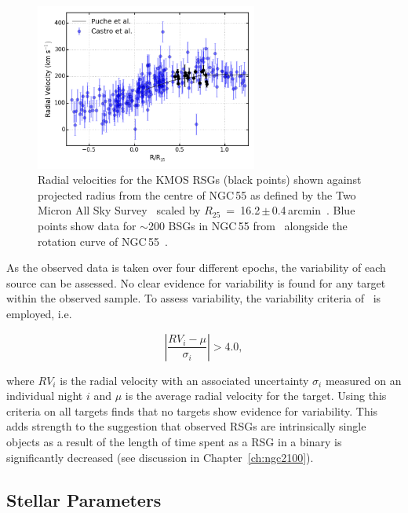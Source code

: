 \begin{figure}
 \centering
 \includegraphics[width=0.65\textwidth]{ngc55/NGC55-RvsRV}
 \caption[Radial velocities for KMOS targets shown against projected radius]{
 Radial velocities for the KMOS RSGs (black points) shown against projected radius from the centre of NGC\,55 as defined by the Two Micron All Sky Survey~\citep[2MASS;][]{2006AJ....131.1163S} scaled by $R_{25}$~=~16.2\,$\pm$\,0.4\,arcmin~\citep{1991rc3..book.....D}.
Blue points show data for $\sim$200 BSGs in NGC\,55 from~\citep[][; shown with 50\% transparency to highlight densely populated areas]{2008A&A...485...41C} alongside the rotation curve of NGC\,55~\citep[black solid line;][]{1991AJ....101..447P}.}
 \label{fig:RvsRV}
\end{figure}

As the observed data is taken over four different epochs, the variability of each source can be assessed. No clear evidence for variability is found for any target within the observed sample.
To assess variability, the variability criteria of~\citep{2012A&A...546A..73H} is employed, i.e.

\begin{equation}
  \left|\frac{RV_i - \mu}{\sigma_i}\right| > 4.0,\label{eq:vary}
\end{equation}

\noindent where $RV_i$ is the radial velocity with an associated uncertainty  $\sigma_i$ measured on an individual night $i$ and $\mu$ is the average radial velocity for the target.
Using this criteria on all targets finds that no targets show evidence for variability.
This adds strength to the suggestion that observed RSGs are intrinsically single objects as a result of the length of time spent as a RSG in a binary is significantly decreased (see discussion in Chapter~\ref{ch:ngc2100}).


\subsection{Stellar Parameters} %
\label{sub:stellar_parameters}

